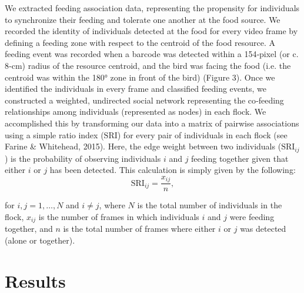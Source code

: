 \documentclass[11pt,a4paper,oneside]{book}
\begin{document}
We extracted feeding association data, representing the propensity for individuals to synchronize their feeding and tolerate one another at the food source. We recorded the identity of individuals detected at the food for every video frame by defining a feeding zone with respect to the centroid of the food resource. A feeding event was recorded when a barcode was detected within a 154‐pixel (or c. 8‐cm) radius of the resource centroid, and the bird was facing the food (i.e. the centroid was within the 180° zone in front of the bird) (Figure 3). Once we identified the individuals in every frame and classified feeding events, we constructed a weighted, undirected social network representing the co‐feeding relationships among individuals (represented as nodes) in each flock. We accomplished this by transforming our data into a matrix of pairwise associations using a simple ratio index ($\mathrm{SRI}$) for every pair of individuals in each flock (see Farine & Whitehead, 2015). Here, the edge weight between two individuals ($\mathrm{SRI}_{ij}$) is the probability of observing individuals $i$ and $j$ feeding together given that either $i$ or $j$ has been detected. This calculation is simply given by the following:
\begin{equation}
    \mathrm{SRI}_{ij} = \frac{x_{ij}}{n},
\end{equation}

for $i, j = 1, \dots, N$ and $i \neq j$, where $N$ is the total number of individuals in the flock, $x_{ij}$ is the number of frames in which individuals $i$ and $j$ were feeding together, and $n$ is the total number of frames where either $i$ or $j$ was detected (alone or together).

\section{Results}
\end{document}
